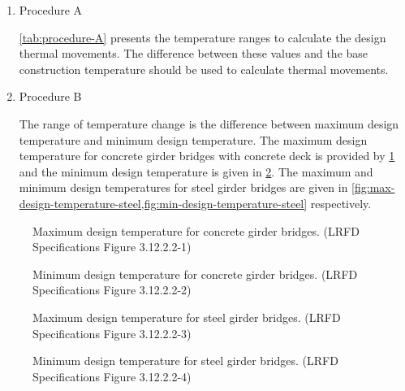 \begin{enumerate}
  \item Procedure A \par
  \cref{tab:procedure-A} presents the temperature ranges to calculate the design thermal movements. The difference between these values and the base construction temperature should be used to calculate thermal movements.

  \begin{table}
    \caption{Procedure A—Temperature Changes. (LRFD Specifications Table 3.12.2.1-1)}\label{tab:procedure-A}
  \end{table}
  \item Procedure B \par
  The range of temperature change is the difference between maximum design temperature and minimum design temperature. The maximum design temperature for concrete girder bridges with concrete deck is provided by \cref{fig:max-design-temperature-concrete} and the minimum design temperature is given in \cref{fig:min-design-temperature-concrete}. The maximum and minimum design temperatures for steel girder bridges are given in \cref{fig:max-design-temperature-steel,fig:min-design-temperature-steel} respectively.
\end{enumerate}

\begin{figure}
  \caption{Maximum design temperature for concrete girder bridges. (LRFD Specifications Figure 3.12.2.2-1)}
  \label{fig:max-design-temperature-concrete}
\end{figure}

\begin{figure}
  \caption{Minimum design temperature for concrete girder bridges. (LRFD Specifications Figure 3.12.2.2-2)}
  \label{fig:min-design-temperature-concrete}
\end{figure}

\begin{figure}
  \caption{Maximum design temperature for steel girder bridges. (LRFD Specifications Figure 3.12.2.2-3)}
  \label{fig:max-design-temperature-steel}
\end{figure}

\begin{figure}
  \caption{Minimum design temperature for steel girder bridges. (LRFD Specifications Figure 3.12.2.2-4)}
  \label{fig:min-design-temperature-steel}
\end{figure}

